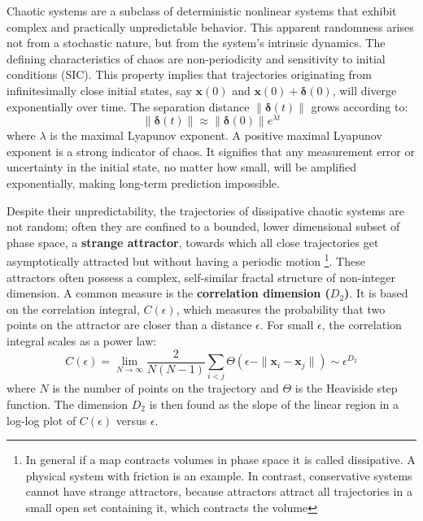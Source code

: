 \documentclass[a4paper,12pt]{article}
\begin{document}
Chaotic systems are a subclass of deterministic nonlinear systems that exhibit complex and practically unpredictable behavior. This apparent randomness arises not from a stochastic nature, but from the system's intrinsic dynamics. The defining characteristics of chaos are non-periodicity and sensitivity to initial conditions (SIC). This property implies that trajectories originating from infinitesimally close initial states, say $\mathbf{x}(0)$ and $\mathbf{x}(0) + \bm{\delta}(0)$, will diverge exponentially over time. The separation distance $\|\bm{\delta}(t)\|$ grows according to:
\begin{equation}
    \|\bm{\delta}(t)\| \approx \|\bm{\delta}(0)\| e^{\lambda t}
\end{equation}
where $\lambda$ is the maximal Lyapunov exponent. A positive maximal Lyapunov exponent is a strong indicator of chaos. It signifies that any measurement error or uncertainty in the initial state, no matter how small, will be amplified exponentially, making long-term prediction impossible.

Despite their unpredictability, the trajectories of dissipative chaotic systems are not random; often they are confined to a bounded, lower dimensional subset of phase space, a \textbf{strange attractor}, towards which all close trajectories get asymptotically attracted but without having a periodic motion \footnote{In general if a map contracts volumes in phase space it is called dissipative. A physical system with friction is an example. In contrast, conservative systems cannot have strange attractors, because attractors attract all trajectories in a small open set containing it, which contracts the volume}.
These attractors often possess a complex, self-similar fractal structure of non-integer dimension. A common measure is the \textbf{correlation dimension ($D_2$)}. It is based on the correlation integral, $C(\epsilon)$, which measures the probability that two points on the attractor are closer than a distance $\epsilon$. For small $\epsilon$, the correlation integral scales as a power law:
\begin{equation}
    C(\epsilon) = \lim_{N \to \infty} \frac{2}{N(N-1)} \sum_{i<j} \Theta(\epsilon - \|\mathbf{x}_i - \mathbf{x}_j\|) \sim \epsilon^{D_2}
\end{equation}
where $N$ is the number of points on the trajectory and $\Theta$ is the Heaviside step function. The dimension $D_2$ is then found as the slope of the linear region in a log-log plot of $C(\epsilon)$ versus $\epsilon$.
\end{document}
